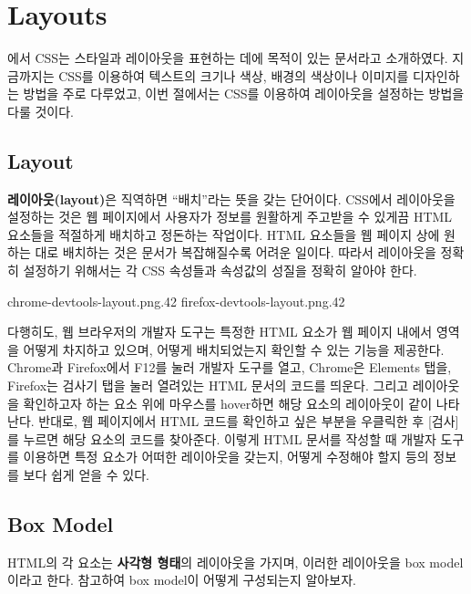 \section{Layouts}\label{sect:layouts}

에서 CSS는 스타일과 레이아웃을 표현하는 데에 목적이 있는 문서라고 소개하였다. 지금까지는 CSS를 이용하여 텍스트의 크기나 색상, 배경의 색상이나 이미지를 디자인하는 방법을 주로 다루었고, 이번 절에서는 CSS를 이용하여 레이아웃을 설정하는 방법을 다룰 것이다.

\subsection*{Layout}
\textbf{레이아웃(layout)}은 직역하면 ``배치''라는 뜻을 갖는 단어이다. CSS에서 레이아웃을 설정하는 것은 웹 페이지에서 사용자가 정보를 원활하게 주고받을 수 있게끔 HTML 요소들을 적절하게 배치하고 정돈하는 작업이다. HTML 요소들을 웹 페이지 상에 원하는 대로 배치하는 것은 문서가 복잡해질수록 어려운 일이다. 따라서 레이아웃을 정확히 설정하기 위해서는 각 CSS 속성들과 속성값의 성질을 정확히 알아야 한다.

    {
            {chrome-devtools-layout.png}{.42}
            {firefox-devtools-layout.png}{.42}
    }

다행히도, 웹 브라우저의 개발자 도구는 특정한 HTML 요소가 웹 페이지 내에서 영역을 어떻게 차지하고 있으며, 어떻게 배치되었는지 확인할 수 있는 기능을 제공한다. Chrome과 Firefox에서 F12를 눌러 개발자 도구를 열고, Chrome은 Elements 탭을, Firefox는 검사기 탭을 눌러 열려있는 HTML 문서의 코드를 띄운다. 그리고 레이아웃을 확인하고자 하는 요소 위에 마우스를 hover하면 해당 요소의 레이아웃이 \과 같이 나타난다. 반대로, 웹 페이지에서 HTML 코드를 확인하고 싶은 부분을 우클릭한 후 [검사]를 누르면 해당 요소의 코드를 찾아준다. 이렇게 HTML 문서를 작성할 때 개발자 도구를 이용하면 특정 요소가 어떠한 레이아웃을 갖는지, 어떻게 수정해야 할지 등의 정보를 보다 쉽게 얻을 수 있다.

\subsection*{Box Model}
HTML의 각 요소는 \textbf{사각형 형태}의 레이아웃을 가지며, 이러한 레이아웃을 box model이라고 한다. \을 참고하여 box model이 어떻게 구성되는지 알아보자.

